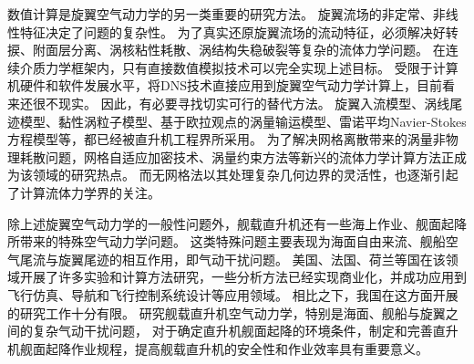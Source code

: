 \documentclass[doctor,openright,twoside,color]{buaathesis}
\begin{document}
数值计算是旋翼空气动力学的另一类重要的研究方法。
旋翼流场的非定常、非线性特征决定了问题的复杂性。
为了真实还原旋翼流场的流动特征，必须解决好转捩、附面层分离、涡核粘性耗散、涡结构失稳破裂等复杂的流体力学问题。
在连续介质力学框架内，只有直接数值模拟技术可以完全实现上述目标。
受限于计算机硬件和软件发展水平，将DNS技术直接应用到旋翼空气动力学计算上，目前看来还很不现实。
因此，有必要寻找切实可行的替代方法。
旋翼入流模型、涡线尾迹模型、黏性涡粒子模型、基于欧拉观点的涡量输运模型、雷诺平均Navier-Stokes方程模型等，都已经被直升机工程界所采用。
为了解决网格离散带来的涡量非物理耗散问题，网格自适应加密技术、涡量约束方法等新兴的流体力学计算方法正成为该领域的研究热点。
而无网格法以其处理复杂几何边界的灵活性，也逐渐引起了计算流体力学界的关注。

除上述旋翼空气动力学的一般性问题外，舰载直升机还有一些海上作业、舰面起降所带来的特殊空气动力学问题。
这类特殊问题主要表现为海面自由来流、舰船空气尾流与旋翼尾迹的相互作用，即气动干扰问题。
美国、法国、荷兰等国在该领域开展了许多实验和计算方法研究，一些分析方法已经实现商业化，并成功应用到飞行仿真、导航和飞行控制系统设计等应用领域。
相比之下，我国在这方面开展的研究工作十分有限。
研究舰载直升机空气动力学，特别是海面、舰船与旋翼之间的复杂气动干扰问题，
对于确定直升机舰面起降的环境条件，制定和完善直升机舰面起降作业规程，提高舰载直升机的安全性和作业效率具有重要意义。

\cleardoublepage
{}
{}

\cleardoublepage
\end{document}
